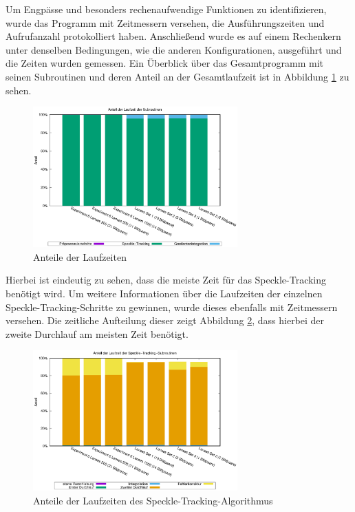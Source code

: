 Um Engpässe und besonders rechenaufwendige Funktionen zu identifizieren, wurde das Programm mit Zeitmessern versehen, die Ausführungszeiten und Aufrufanzahl protokolliert haben. Anschließend wurde es auf einem Rechenkern unter denselben Bedingungen, wie die anderen Konfigurationen, ausgeführt und die Zeiten wurden gemessen. Ein Überblick über das Gesamtprogramm mit seinen Subroutinen und deren Anteil an der Gesamtlaufzeit ist in Abbildung \ref{fig:perc_main} zu sehen.

\begin{center}
	\begin{figure}[htbp]
		\centering
		\includegraphics[width=0.7\textwidth]{pdf/main}
		\caption{Anteile der Laufzeiten}
		\label{fig:perc_main}
	\end{figure}
\end{center}

Hierbei ist eindeutig zu sehen, dass die meiste Zeit für das Speckle-Tracking benötigt wird. Um weitere Informationen über die Laufzeiten der einzelnen Speckle-Tracking-Schritte zu gewinnen, wurde dieses ebenfalls mit Zeitmessern versehen. Die zeitliche Aufteilung dieser zeigt Abbildung \ref{fig:perc_speckle}, dass hierbei der zweite Durchlauf am meisten Zeit benötigt. 

\begin{center}
	\begin{figure}[htbp]
		\centering
		\includegraphics[width=0.7\textwidth]{pdf/speckle}
		\caption{Anteile der Laufzeiten des Speckle-Tracking-Algorithmus}
		\label{fig:perc_speckle}
	\end{figure}
\end{center}

